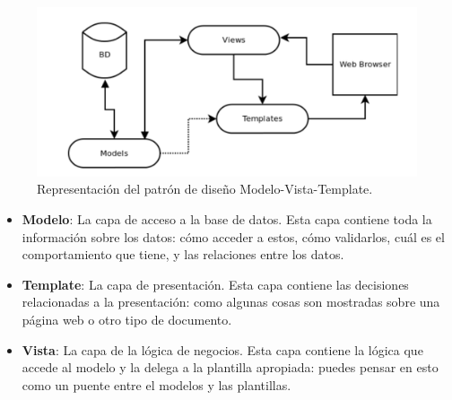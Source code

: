 \begin{figure}
    \centering
    \includegraphics[width=\textwidth]{capitulo2/images/mtv.png}
    \caption{Representación del patrón de diseño Modelo-Vista-Template.}
    \label{fig:mtv}
\end{figure}

\begin{itemize}
    \item \textbf{Modelo}: La capa de acceso a la base de datos. Esta capa contiene toda la información sobre los datos: cómo acceder a estos, cómo validarlos, cuál es el comportamiento que tiene, y las relaciones entre los datos.
    \item \textbf{Template}: La capa de presentación. Esta capa contiene las decisiones relacionadas a la presentación: como algunas cosas son mostradas sobre una página web o otro tipo de documento.
    \item \textbf{Vista}: La capa de la lógica de negocios. Esta capa contiene la lógica que accede al modelo y la delega a la plantilla apropiada: puedes pensar en esto como un puente entre el modelos y las plantillas.
\end{itemize}



